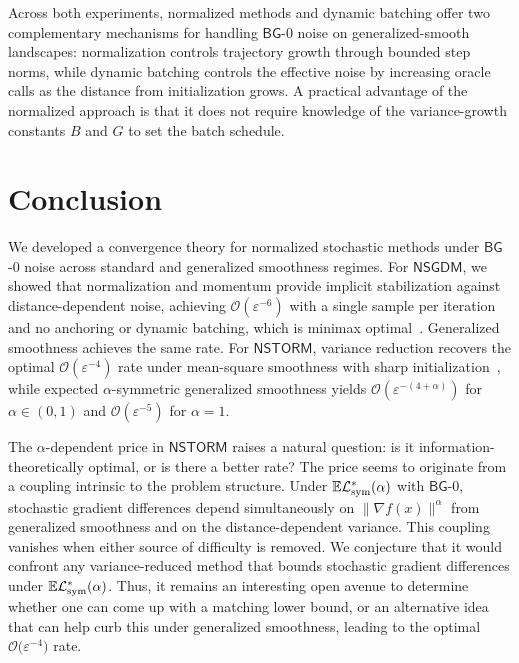 \documentclass[letter,11pt]{article}
\newcommand{\E}{\mathbb{E}}
\newcommand{\Ocal}{\mathcal{O}}
\newcommand{\Lcal}{\mathcal{L}}
\begin{document}
Across both experiments, normalized methods and dynamic batching offer two complementary mechanisms for handling $\mathsf{BG}$-0 noise on generalized-smooth landscapes: normalization controls trajectory growth through bounded step norms, while dynamic batching controls the effective noise by increasing oracle calls as the distance from
initialization grows. A practical advantage of the normalized approach is that it does not require knowledge of the variance-growth constants $B$ and $G$ to set the batch schedule.
\section{Conclusion}
\label{sec:conclusion}
We developed a convergence theory for normalized stochastic methods under $\mathsf{BG}$-0 noise across standard and generalized smoothness regimes. For $\mathsf{NSGDM}$, we showed that normalization and momentum provide implicit stabilization against distance-dependent noise, achieving $\Ocal(\varepsilon^{-6})$ with a single sample per iteration and no anchoring or dynamic batching, which is minimax optimal~\cite{fazla2026lower}. Generalized smoothness achieves the same rate. For $\mathsf{NSTORM}$, variance reduction recovers the optimal $\Ocal(\varepsilon^{-4})$ rate under mean-square smoothness with sharp initialization~\cite{fazla2026lower}, while expected $\alpha$-symmetric generalized smoothness yields $\Ocal(\varepsilon^{-(4+\alpha)})$ for $\alpha\in(0,1)$ and
$\Ocal(\varepsilon^{-5})$ for $\alpha=1$.

The $\alpha$-dependent price in $\mathsf{NSTORM}$ raises a natural question: is it information-theoretically optimal, or is there a better rate? The price seems to originate from a coupling intrinsic to the problem structure. Under $\E\Lcal^*_{\rm sym}(\alpha)$ with $\mathsf{BG}$-0, stochastic gradient differences depend simultaneously on $\|\nabla f(x)\|^\alpha$ from generalized smoothness and on the distance-dependent variance. This coupling vanishes when either source of difficulty is removed. We conjecture that it would confront any variance-reduced method that bounds stochastic gradient differences under $\E\Lcal_{\rm sym}^*(\alpha)$. Thus, it remains an interesting open avenue to determine whether one can come up with a matching lower bound, or an alternative idea that can help curb this under generalized smoothness, leading to the optimal $\Ocal({\varepsilon^{-4})}$ rate.


\newpage
\appendix
\end{document}
